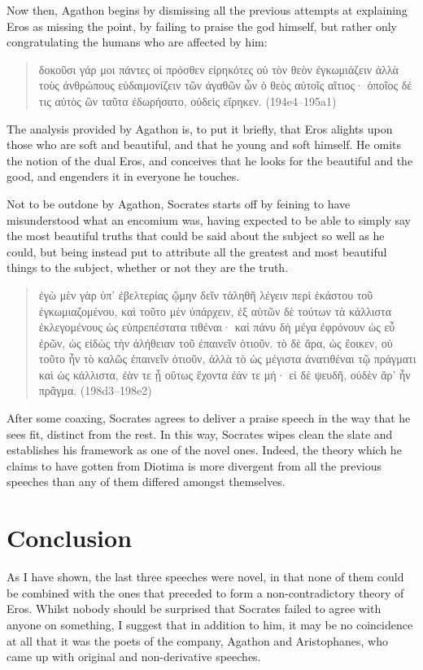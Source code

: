 Now then, Agathon begins by dismissing all the previous attempts at
explaining Eros as missing the point, by failing to praise the god
himself, but rather only congratulating the humans who are affected by
him:

\begin{quote}
\textgreek{δοκοῦσι γάρ μοι πάντες οἱ πρόσθεν εἰρηκότες οὐ τὸν θεὸν
ἐγκωμιάζειν ἀλλὰ τοὺς ἀνθρώπους εὐδαιμονίζειν τῶν ἀγαθῶν ὧν ὁ θεὸς
αὐτοῖς αἴτιος· ὁποῖος δέ τις αὐτὸς ὢν ταῦτα ἐδωρήσατο, οὐδεὶς
εἴρηκεν.} (194e4--195a1)
\end{quote}

The analysis provided by Agathon is, to put it briefly, that Eros
alights upon those who are soft and beautiful, and that he young and
soft himself. He omits the notion of the dual Eros, and conceives that
he looks for the beautiful and the good, and engenders it in everyone he
touches.

Not to be outdone by Agathon, Socrates starts off by feining to have
misunderstood what an encomium was, having expected to be able to simply
say the most beautiful truths that could be said about the subject so
well as he could, but being instead put to attribute all the greatest
and most beautiful things to the subject, whether or not they are the
truth.

\begin{quote}
\textgreek{ἐγὼ μὲν γὰρ ὑπ' ἐβελτερίας ᾤμην δεῖν τἀληθῆ λέγειν περὶ
ἑκάστου τοῦ ἐγκωμιαζομένου, καὶ τοῦτο μὲν ὑπάρχειν, ἐξ αὐτῶν δὲ τούτων
τὰ κάλλιστα ἐκλεγομένους ὡς εὐπρεπέστατα τιθέναι· καὶ πάνυ δὴ μέγα
ἐφρόνουν ὡς εὖ ἐρῶν, ὡς εἰδὼς τὴν ἀλήθειαν τοῦ ἐπαινεῖν ὁτιοῦν. τὸ δὲ
ἄρα, ὡς ἔοικεν, οὐ τοῦτο ἦν τὸ καλῶς ἐπαινεῖν ὁτιοῦν, ἀλλὰ τὸ ὡς
μέγιστα ἀνατιθέναι τῷ πράγματι καὶ ὡς κάλλιστα, ἐὰν τε ᾖ οὕτως ἔχοντα
ἐάν τε μή· εἰ δὲ ψευδῆ, οὐδὲν ἄρ' ἦν πρᾶγμα.} (198d3--198e2)
\end{quote}

After some coaxing, Socrates agrees to deliver a praise speech in the
way that he sees fit, distinct from the rest. In this way, Socrates
wipes clean the slate and establishes his framework as one of the novel
ones. Indeed, the theory which he claims to have gotten from Diotima is
more divergent from all the previous speeches than any of them differed
amongst themselves.

\section{Conclusion}

As I have shown, the last three speeches were novel, in that none of
them could be combined with the ones that preceded to form a
non-contradictory theory of Eros. Whilst nobody should be surprised that
Socrates failed to agree with anyone on something, I suggest that in
addition to him, it may be no coincidence at all that it was the poets
of the company, Agathon and Aristophanes, who came up with original and
non-derivative speeches.
